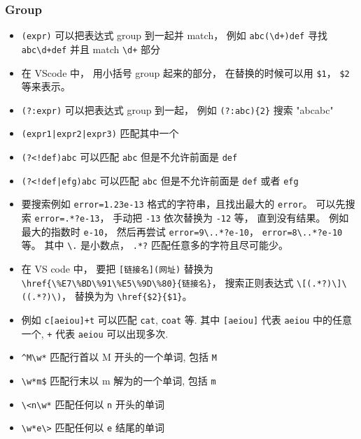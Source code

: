\subsubsection{Group}
\begin{itemize}
\item \verb`(expr)` 可以把表达式 group 到一起并 match， 例如 \verb`abc(\d+)def` 寻找 \verb`abc\d+def` 并且 match \verb`\d+` 部分
\item 在 VScode 中， 用小括号 group 起来的部分， 在替换的时候可以用 \verb`$1`， \verb`$2` 等来表示。
\item \verb`(?:expr)` 可以把表达式 group 到一起， 例如 \verb`(?:abc){2}` 搜索 "abcabc"
\item \verb`(expr1|expr2|expr3)` 匹配其中一个
\item \verb`(?<!def)abc` 可以匹配 \verb`abc` 但是不允许前面是 \verb`def`
\item \verb`(?<!def|efg)abc` 可以匹配 \verb`abc` 但是不允许前面是 \verb`def` 或者 \verb`efg`
\end{itemize}

\begin{example}{}
\begin{itemize}
\item 要搜索例如 \verb`error=1.23e-13` 格式的字符串，且找出最大的 \verb`error`。 可以先搜索 \verb`error=.*?e-13`， 手动把 \verb`-13` 依次替换为 \verb`-12` 等， 直到没有结果。 例如最大的指数时 \verb`e-10`， 然后再尝试 \verb`error=9\..*?e-10`， \verb`error=8\..*?e-10` 等。 其中 \verb`\.` 是小数点， \verb`.*?` 匹配任意多的字符且尽可能少。
\item 在 VS code 中， 要把 \verb`[链接名](网址)` 替换为 \verb`\href{\%E7\%BD\%91\%E5\%9D\%80}{链接名}`， 搜索正则表达式 \verb`\[(.*?)\]\((.*?)\)`， 替换为为 \verb`\href{$2}{$1}`。
\item 例如 \verb`c[aeiou]+t` 可以匹配 \verb`cat`, \verb`coat` 等. 其中 \verb`[aeiou]` 代表 \verb`aeiou` 中的任意一个, \verb`+` 代表 \verb`aeiou` 可以出现多次.
\item \verb`^M\w*` 匹配行首以 M 开头的一个单词, 包括 \verb`M`
\item \verb`\w*m$` 匹配行末以 m 解为的一个单词, 包括 \verb`m`
\item \verb`\<n\w*` 匹配任何以 \verb`n` 开头的单词
\item \verb`\w*e\>` 匹配任何以 \verb`e` 结尾的单词
\end{itemize}
\end{example}
